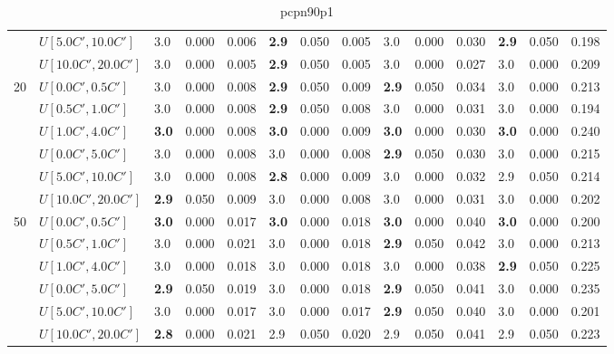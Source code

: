 \begin{table}
{\begin{tabular}{|l|l||l|l|l||l|l|l||l|l|l||l|l|l|}
       & $U[5.0C',10.0C']$ & 3.0 & 0.000 & 0.006 & \textbf{2.9} & 0.050 & 0.005 & 3.0 & 0.000 & 0.030 & \textbf{2.9} & 0.050 & 0.198 \\
       & $U[10.0C',20.0C']$ & 3.0 & 0.000 & 0.005 & \textbf{2.9} & 0.050 & 0.005 & 3.0 & 0.000 & 0.027 & 3.0 & 0.000 & 0.209 \\
      \hline\hline
      \multirow{6}{*}{20} & $U[0.0C',0.5C']$ & 3.0 & 0.000 & 0.008 & \textbf{2.9} & 0.050 & 0.009 & \textbf{2.9} & 0.050 & 0.034 & 3.0 & 0.000 & 0.213 \\
       & $U[0.5C',1.0C']$ & 3.0 & 0.000 & 0.008 & \textbf{2.9} & 0.050 & 0.008 & 3.0 & 0.000 & 0.031 & 3.0 & 0.000 & 0.194 \\
       & $U[1.0C',4.0C']$ & \textbf{3.0} & 0.000 & 0.008 & \textbf{3.0} & 0.000 & 0.009 & \textbf{3.0} & 0.000 & 0.030 & \textbf{3.0} & 0.000 & 0.240 \\
       & $U[0.0C',5.0C']$ & 3.0 & 0.000 & 0.008 & 3.0 & 0.000 & 0.008 & \textbf{2.9} & 0.050 & 0.030 & 3.0 & 0.000 & 0.215 \\
       & $U[5.0C',10.0C']$ & 3.0 & 0.000 & 0.008 & \textbf{2.8} & 0.000 & 0.009 & 3.0 & 0.000 & 0.032 & 2.9 & 0.050 & 0.214 \\
       & $U[10.0C',20.0C']$ & \textbf{2.9} & 0.050 & 0.009 & 3.0 & 0.000 & 0.008 & 3.0 & 0.000 & 0.031 & 3.0 & 0.000 & 0.202 \\
      \hline\hline
      \multirow{6}{*}{50} & $U[0.0C',0.5C']$ & \textbf{3.0} & 0.000 & 0.017 & \textbf{3.0} & 0.000 & 0.018 & \textbf{3.0} & 0.000 & 0.040 & \textbf{3.0} & 0.000 & 0.200 \\
       & $U[0.5C',1.0C']$ & 3.0 & 0.000 & 0.021 & 3.0 & 0.000 & 0.018 & \textbf{2.9} & 0.050 & 0.042 & 3.0 & 0.000 & 0.213 \\
       & $U[1.0C',4.0C']$ & 3.0 & 0.000 & 0.018 & 3.0 & 0.000 & 0.018 & 3.0 & 0.000 & 0.038 & \textbf{2.9} & 0.050 & 0.225 \\
       & $U[0.0C',5.0C']$ & \textbf{2.9} & 0.050 & 0.019 & 3.0 & 0.000 & 0.018 & \textbf{2.9} & 0.050 & 0.041 & 3.0 & 0.000 & 0.235 \\
       & $U[5.0C',10.0C']$ & 3.0 & 0.000 & 0.017 & 3.0 & 0.000 & 0.017 & \textbf{2.9} & 0.050 & 0.040 & 3.0 & 0.000 & 0.201 \\
       & $U[10.0C',20.0C']$ & \textbf{2.8} & 0.000 & 0.021 & 2.9 & 0.050 & 0.020 & 2.9 & 0.050 & 0.041 & 2.9 & 0.050 & 0.223 \\
      \hline
      \end{tabular}
      }
      \caption{pcpn90p1}
      \label{tab:pcpn90p1}
	  \end{table}
      
